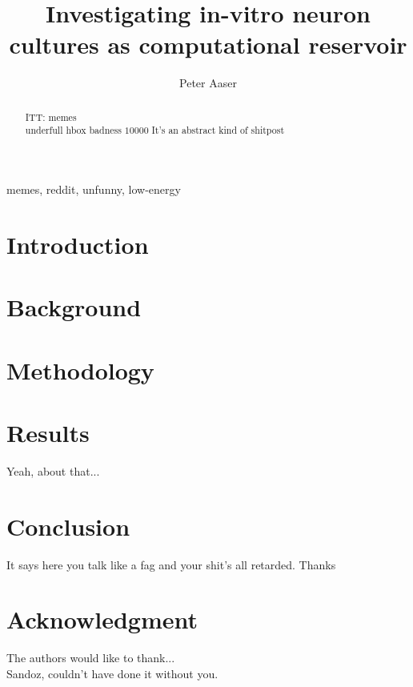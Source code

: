 \documentclass[journal]{IEEEtran}
\begin{document}
\title{Investigating in-vitro neuron cultures as computational reservoir}

\author{Peter Aaser}
%
\maketitle

\begin{abstract}
  ITT: memes\\
  underfull hbox badness $10000$
  It's an abstract kind of shitpost
  \blindtext[3]

\end{abstract}

\begin{IEEEkeywords}
memes, reddit, unfunny, low-energy
\end{IEEEkeywords}

\section{Introduction}

\section{Background}

\section{Methodology}

\section{Results}
Yeah, about that...

\section{Conclusion}
It says here you talk like a fag and your shit's all retarded. Thanks

\section*{Acknowledgment}
The authors would like to thank...\\
Sandoz, couldn't have done it without you.


 

\end{document}
